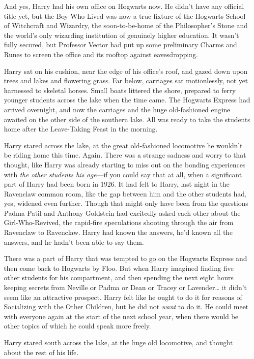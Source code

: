 And yes, Harry had his own office on Hogwarts now. He didn't have any official title yet, but the Boy-Who-Lived was now a true fixture of the Hogwarts School of Witchcraft and Wizardry, the soon-to-be-home of the Philosopher's Stone and the world's only wizarding institution of genuinely higher education. It wasn't fully secured, but Professor Vector had put up some preliminary Charms and Runes to screen the office and its rooftop against eavesdropping.

Harry sat on his cushion, near the edge of his office's roof, and gazed down upon trees and lakes and flowering grass. Far below, carriages sat motionlessly, not yet harnessed to skeletal horses. Small boats littered the shore, prepared to ferry younger students across the lake when the time came. The Hogwarts Express had arrived overnight, and now the carriages and the huge old-fashioned engine awaited on the other side of the southern lake. All was ready to take the students home after the Leave-Taking Feast in the morning.

Harry stared across the lake, at the great old-fashioned locomotive he wouldn't be riding home this time. Again. There was a strange sadness and worry to that thought, like Harry was already starting to miss out on the bonding experiences with \emph{the other students his age}---if you could say that at all, when a significant part of Harry had been born in 1926. It had felt to Harry, last night in the Ravenclaw common room, like the gap between him and the other students had, yes, widened even further. Though that might only have been from the questions Padma Patil and Anthony Goldstein had excitedly asked each other about the Girl-Who-Revived, the rapid-fire speculations shooting through the air from Ravenclaw to Ravenclaw. Harry had known the answers, he'd known all the answers, and he hadn't been able to say them.

There was a part of Harry that was tempted to go on the Hogwarts Express and then come back to Hogwarts by Floo. But when Harry imagined finding five other students for his compartment, and then spending the next eight hours keeping secrets from Neville or Padma or Dean or Tracey or Lavender{\ldots} it didn't seem like an attractive prospect. Harry felt like he ought to do it for reasons of Socializing with the Other Children, but he did not \emph{want} to do it. He could meet with everyone again at the start of the next school year, when there would be other topics of which he could speak more freely.

Harry stared south across the lake, at the huge old locomotive, and thought about the rest of his life.

